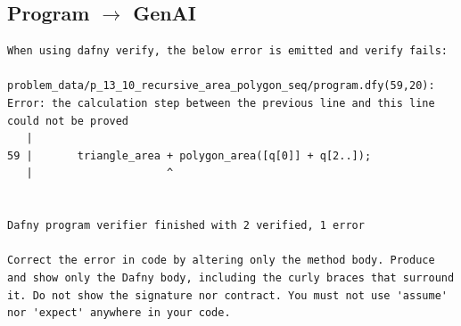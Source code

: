 \documentclass{article}
\begin{document}
\subsection*{Program $\rightarrow$ GenAI}
\begin{lstlisting}
When using dafny verify, the below error is emitted and verify fails:

problem_data/p_13_10_recursive_area_polygon_seq/program.dfy(59,20): Error: the calculation step between the previous line and this line could not be proved
   |
59 |       triangle_area + polygon_area([q[0]] + q[2..]);
   |                     ^


Dafny program verifier finished with 2 verified, 1 error

Correct the error in code by altering only the method body. Produce and show only the Dafny body, including the curly braces that surround it. Do not show the signature nor contract. You must not use 'assume' nor 'expect' anywhere in your code.
\end{lstlisting}
\end{document}
